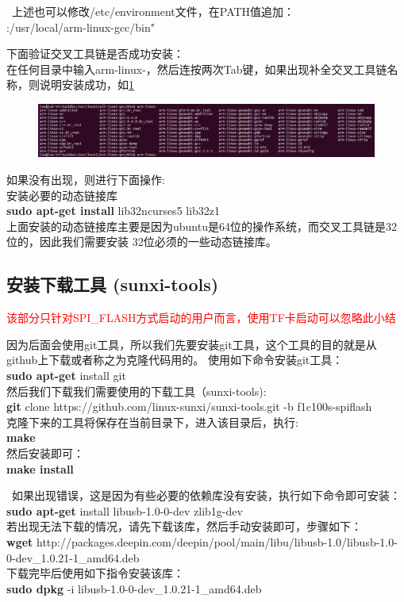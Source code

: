 \begin{tcolorbox}[colback=red!5!white,colframe=red!75!black]
\faHandORight \ 上述也可以修改/etc/environment文件，在PATH值追加：\\
:/usr/local/arm-linux-gcc/bin"
\end{tcolorbox}
\noindent
下面验证交叉工具链是否成功安装：\\
在任何目录中输入arm-linux-，然后连按两次Tab键，如果出现补全交叉工具链名称，则说明安装成功，如\ref{fig:arm-linux-gcc}
\begin{figure}[htbp]
	\centering
	\includegraphics[width=1\linewidth]{chapter2/img/arm-linux-gcc}
	\caption{}
	\label{fig:arm-linux-gcc}
\end{figure} 

\noindent
如果没有出现，则进行下面操作:\\
安装必要的动态链接库\\
\textbf{sudo apt-get install} lib32ncurses5 lib32z1  \\
上面安装的动态链接库主要是因为ubuntu是64位的操作系统，而交叉工具链是32位的，因此我们需要安装
32位必须的一些动态链接库。


\subsection{安装下载工具 (sunxi-tools)}
\noindent 
\faWarning \quad \textcolor{red}{该部分只针对SPI\_FLASH方式启动的用户而言，使用TF卡启动可以忽略此小结}

因为后面会使用git工具，所以我们先要安装git工具，这个工具的目的就是从github上下载或者称之为克隆代码用的。
使用如下命令安装git工具：\\
\textbf{sudo apt-get}  install git  \\
\noindent 
然后我们下载我们需要使用的下载工具（sunxi-tools):\\
\textbf{git} clone https://github.com/linux-sunxi/sunxi-tools.git -b f1c100s-spiflash \\
克隆下来的工具将保存在当前目录下，进入该目录后，执行:\\
\textbf{make} \\
然后安装即可：\\
\textbf{make install} 


\begin{tcolorbox}[colback=red!5!white,colframe=red!75!black]
\faWarning \ 
如果出现错误，这是因为有些必要的依赖库没有安装，执行如下命令即可安装：\\	
\textbf{sudo apt-get} install libusb-1.0-0-dev zlib1g-dev	\\
若出现无法下载的情况，请先下载该库，然后手动安装即可，步骤如下：\\
\textbf{wget }
http://packages.deepin.com/deepin/pool/main/libu/libusb-1.0/libusb-1.0-0-dev\_1.0.21-1\_amd64.deb
\\
下载完毕后使用如下指令安装该库：\\
\textbf{sudo dpkg} -i libusb-1.0-0-dev\_1.0.21-1\_amd64.deb
\end{tcolorbox}

